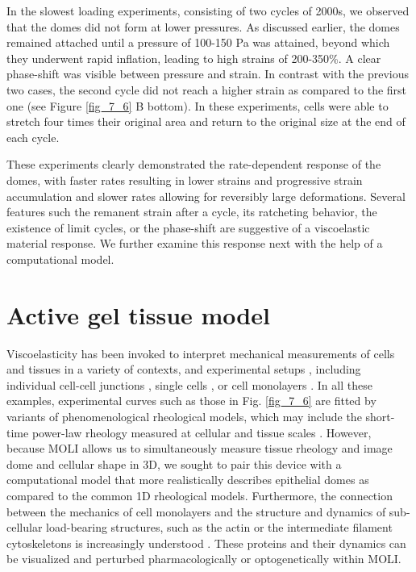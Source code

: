 In the slowest loading experiments, consisting of two cycles of 2000s, we observed that the domes did not form at lower pressures. As discussed earlier, the domes remained attached until a pressure of 100-150 Pa was attained, beyond which they underwent rapid inflation, leading to high strains of 200-350\%. A clear phase-shift was visible between pressure and strain. In contrast with the previous two cases, the second cycle did not reach a higher strain as compared to the first one (see Figure \ref{fig_7_6} B bottom). In these experiments, cells were able to stretch four times their original area and return to the original size at the end of each cycle.

These experiments clearly demonstrated the rate-dependent response of the domes, with faster rates resulting in lower strains and progressive strain accumulation and slower rates allowing for reversibly large deformations. Several features such the remanent strain after a cycle, its ratcheting behavior, the existence of limit cycles, or the phase-shift are suggestive of a viscoelastic material response. We further examine this response next with the help of a computational model.




\hypertarget{active-gel-tissue-model}{%
	\section{Active gel tissue model}\label{active-gel-tissue-model}}


Viscoelasticity has been invoked to interpret mechanical measurements of cells and tissues in a variety of contexts, and experimental setups \cite{PULLARKAT200729}, including individual cell-cell junctions \cite{clement2017}, single cells \cite{PhysRevLett.94.098103,Fischer-Friedrich:2016aa}, or cell monolayers \cite{Fernandez_2007,khalilgharibi2019}. In all these examples, experimental curves such as those in Fig. \ref{fig_7_6} are fitted by variants of phenomenological rheological models, which may include the short-time power-law rheology measured at cellular and tissue scales   \cite{PULLARKAT200729,doi:10.1098/rsos.190920,khalilgharibi2019}. However, because MOLI allows us to simultaneously measure tissue rheology and image dome and cellular shape in 3D, we sought to pair this device with a computational model that more realistically describes epithelial domes as compared to the common 1D rheological models. Furthermore, the connection between the mechanics of cell monolayers and the structure and dynamics of sub-cellular load-bearing structures, such as the actin or the intermediate filament cytoskeletons is increasingly understood \cite{latorre2018,khalilgharibi2019,duque2023}. These proteins and their dynamics can be visualized and perturbed pharmacologically or optogenetically within MOLI.


